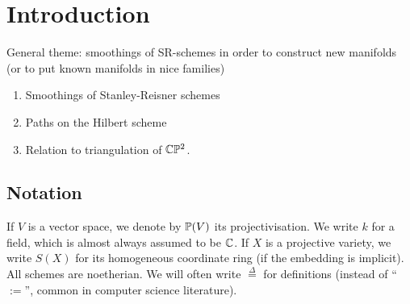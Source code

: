 \chapter{Introduction}
\label{sec:intro}

General theme: smoothings of SR-schemes in order to construct new manifolds (or to put known manifolds in nice families)



\begin{enumerate}
    \item Smoothings of Stanley-Reisner schemes
    \item Paths on the Hilbert scheme
    \item Relation to triangulation of $\C \P^2$.
\end{enumerate}



\listoftodos[Notes]

\section{Notation}

If $V$ is a vector space, we denote by $\P(V)$ its projectivisation. We write $k$ for a field, which is almost always assumed to be $\C$. If $X$ is a projective variety, we write $S(X)$ for its homogeneous coordinate ring (if the embedding is implicit). All schemes are noetherian. We will often write $\stackrel \Delta = $ for definitions (instead of  ``$:=$'', common in computer science literature).